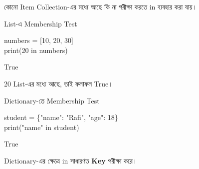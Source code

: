 

কোনো Item Collection-এর মধ্যে আছে কি না পরীক্ষা করতে
\textenglish{\ttfamily in}
ব্যবহার করা যায়।

\begin{codeoutputbox}{List-এ Membership Test}

\noindent
\begin{minipage}[t]{0.53\linewidth}
\codeheading

\begin{english}
\ttfamily
numbers = [10, 20, 30]\\
print(20 in numbers)
\end{english}

\end{minipage}
\hfill
\begin{minipage}[t]{0.43\linewidth}
\outputheading

\begin{center}
\textenglish{\ttfamily True}
\end{center}

20 List-এর মধ্যে আছে, তাই ফলাফল
\textenglish{\ttfamily True}।

\end{minipage}

\end{codeoutputbox}

\begin{codeoutputbox}{Dictionary-তে Membership Test}

\noindent
\begin{minipage}[t]{0.56\linewidth}
\codeheading

\begin{english}
\ttfamily
student = \{"name": "Rafi", "age": 18\}\\
print("name" in student)
\end{english}

\end{minipage}
\hfill
\begin{minipage}[t]{0.40\linewidth}
\outputheading

\begin{center}
\textenglish{\ttfamily True}
\end{center}

Dictionary-এর ক্ষেত্রে
\textenglish{\ttfamily in}
সাধারণত \textbf{Key} পরীক্ষা করে।

\end{minipage}

\end{codeoutputbox}

